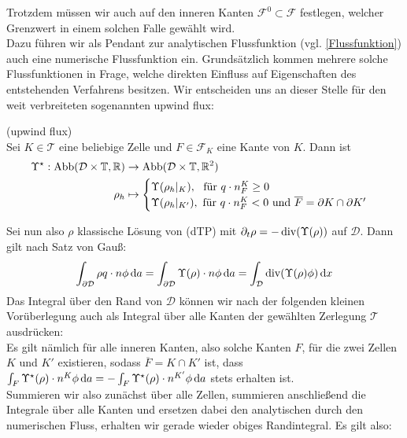 Trotzdem müssen wir auch auf den inneren Kanten $ \mathcal{F}^0 \subset \mathcal{F} $ festlegen, welcher Grenzwert in einem solchen Falle gewählt wird. \\
Dazu führen wir als Pendant zur analytischen Flussfunktion (vgl. \ref{Flussfunktion})
auch eine numerische Flussfunktion ein. Grundsätzlich kommen mehrere solche Flussfunktionen in Frage, welche direkten Einfluss auf Eigenschaften des entstehenden Verfahrens besitzen. Wir entscheiden uns an dieser Stelle für den weit verbreiteten 
sogenannten upwind flux:
\begin{Definition}(upwind flux)\\
	Sei $K \in \mathcal{T}$ eine beliebige Zelle und $ F \in \mathcal{F}_K$ eine Kante von $K$. Dann ist
	\begin{align*}
		\Upsilon^{\star} : \text{Abb}(\mathcal{D}\times\mathbb{T},\mathbb{R}) &\to \text{Abb}(\mathcal{D}\times\mathbb{T},\mathbb{R}^2) \\
		\rho_h &\mapsto 
		\begin{cases}
			\Upsilon(\rho_h|_K) , \ \text{ für } q\cdot n_F^K \geq 0 \\  
			\Upsilon(\rho_h|_{K'}) ,\text{ für } q\cdot n_F^K < 0 \text{ und } \overline{F} = \partial K \cap \partial K'
		\end{cases}
	\end{align*}
\end{Definition}
Sei nun also $ \rho $ klassische Lösung von (dTP) mit $ \partial_t \rho = -\operatorname{div}(\Upsilon(\rho)) $ auf $ \mathcal{D} $. Dann gilt nach Satz von Gauß:
\begin{align}
		\label{gaus1}
		\int_{\partial \mathcal{D}} \rho q \cdot n \phi \, \mathrm{d} a  =\int_{\partial \mathcal{D}} \Upsilon(\rho) \cdot n \phi \, \mathrm{d} a = \int_{\mathcal{D}} \operatorname{div} (\Upsilon(\rho)\phi) \, \mathrm{d} x
\end{align}
Das Integral über den Rand von $ \mathcal{D} $ können wir nach der folgenden kleinen Vorüberlegung auch als Integral über alle Kanten der gewählten Zerlegung $ \mathcal{T} $ ausdrücken: \\
Es gilt nämlich für alle inneren Kanten, also solche Kanten $ F $, für die zwei Zellen $ K $ und $ K' $ existieren, sodass $ \overline{F} = K \cap K' $ ist, dass $ \int_F \Upsilon^{\star}(\rho) \cdot n^K \phi \, \mathrm{d} a = - \int_F \Upsilon^{\star}(\rho) \cdot n^{K'} \phi \, \mathrm{d} a $ stets erhalten ist. \\
Summieren wir also zunächst über alle Zellen, summieren anschließend die Integrale über alle Kanten und ersetzen dabei den analytischen durch den numerischen Fluss, erhalten wir gerade wieder obiges Randintegral. Es gilt also:
